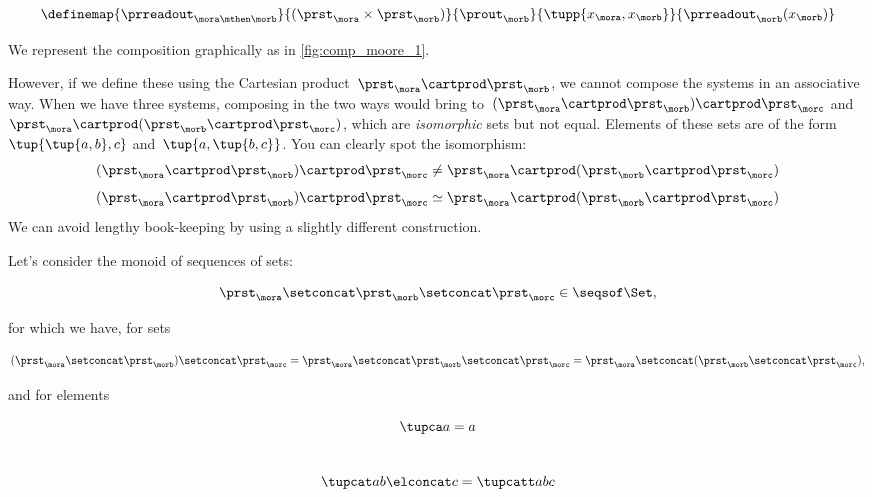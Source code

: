 \begin{equation}\label{eq:moore-comp-naive-3}
  \definemap{
    \prreadout_{\mora\mthen\morb}
    }{
      (\prst_{\mora} \times \prst_{\morb})
    }{
      \prout_{\morb}
    }{
      \tupp{x_{\mora}, x_{\morb}}
    }{
      \prreadout_{\morb}(x_{\morb})
    }
\end{equation}

We represent the composition graphically as in \cref{fig:comp_moore_1}.

However, if we define these using the Cartesian product~$\prst_{\mora} \cartprod \prst_{\morb}$, we cannot compose the systems in an associative way.
When we have three systems, composing in the two ways would bring to~$(\prst_{\mora} \cartprod \prst_{\morb}) \cartprod \prst_{\morc}$ and~$\prst_{\mora} \cartprod (\prst_{\morb} \cartprod \prst_{\morc})$, which are \emph{isomorphic} sets but not equal.
Elements of these sets are of the form~$\tup{\tup{a,b},c}$ and~$\tup{a, \tup{b,c}}$. You can clearly spot the isomorphism:
\begin{equation}\label{eq:assoc-fails1}
(\prst_{\mora} \cartprod \prst_{\morb}) \cartprod \prst_{\morc} \neq \prst_{\mora} \cartprod (\prst_{\morb} \cartprod \prst_{\morc})
\end{equation}
\begin{equation}\label{eq:assoc-fails2}
  (\prst_{\mora} \cartprod \prst_{\morb}) \cartprod \prst_{\morc} \simeq \prst_{\mora} \cartprod (\prst_{\morb} \cartprod \prst_{\morc})
  \end{equation}
We can avoid lengthy book-keeping by using a slightly different construction.

Let's consider the monoid of sequences of sets:

\begin{equation}\label{eq:sets-monoid}
\prst_{\mora} \setconcat \prst_{\morb} \setconcat \prst_{\morc} \in \seqsof\Set,
\end{equation}

for which we have, for sets

\begin{equation}\label{eq:sets-monoid-comp}
  (\prst_{\mora} \setconcat \prst_{\morb} )\setconcat \prst_{\morc} =
  \prst_{\mora} \setconcat \prst_{\morb} \setconcat \prst_{\morc} =
  \prst_{\mora} \setconcat (\prst_{\morb} \setconcat \prst_{\morc}),
\end{equation}

and for elements

\begin{equation}
  \tupca a   = a
\end{equation}
~
\begin{equation}\label{eq:sets-monoid-el-cat}
   \tupcat a b \elconcat c = \tupcatt a b c
\end{equation}

